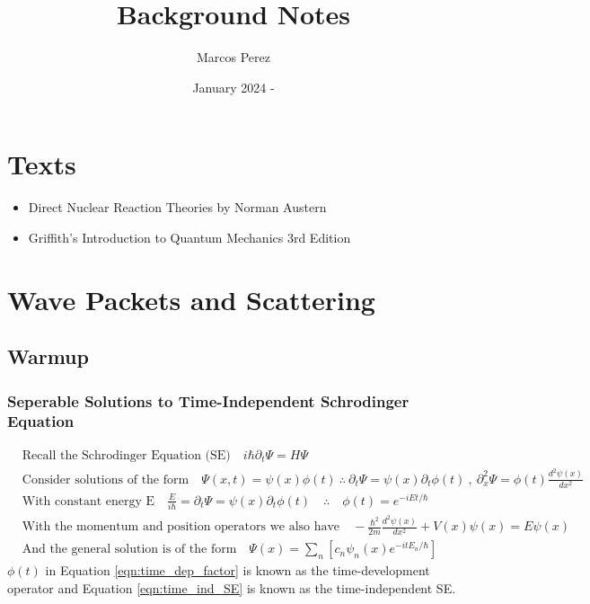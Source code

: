 \documentclass[12pt]{article}
\title{Background Notes}
\author{Marcos Perez}
\date{January 2024 - }
\begin{document}
\maketitle

\section{Texts}
\begin{itemize}
    \item Direct Nuclear Reaction Theories by Norman Austern
    \item Griffith's Introduction to Quantum Mechanics 3rd Edition
\end{itemize}

\section{Wave Packets and Scattering}
\subsection{Warmup}
\subsubsection{Seperable Solutions to Time-Independent Schrodinger Equation}
\begin{align}
&\text{Recall the Schrodinger Equation (SE)}\quad i\hbar\partial_t\Psi=H\Psi\\
&\text{Consider solutions of the form}\quad \Psi(x,t)=\psi(x)\phi(t)\ \therefore\ \partial_t\Psi=\psi(x)\partial_t\phi(t)\ ,\ 
\partial^2_x\Psi=\phi(t)\frac{d^2\psi(x)}{dx^2}\\
\label{eqn:time_dep_factor}
&\text{With constant energy E}\quad \frac{E}{i\hbar}=\partial_t\Psi=\psi(x)\partial_t\phi(t)\quad\therefore\quad \phi(t)=e^{-i Et/\hbar}\\
\label{eqn:time_ind_SE}
&\text{With the momentum and position operators we also have}\quad -\frac{\hbar^2}{2m}\frac{d^2\psi(x)}{dx^2}+V(x)\psi(x)=E\psi(x) \\
&\text{And the general solution is of the form}\quad \Psi(x)=\sum_n\left[c_n\psi_n(x)e^{-itE_n/\hbar}\right]
\end{align}
$\phi(t)$ in Equation \ref{eqn:time_dep_factor} is known as the time-development operator and Equation \ref{eqn:time_ind_SE} is known as the time-independent SE.
\end{document}
